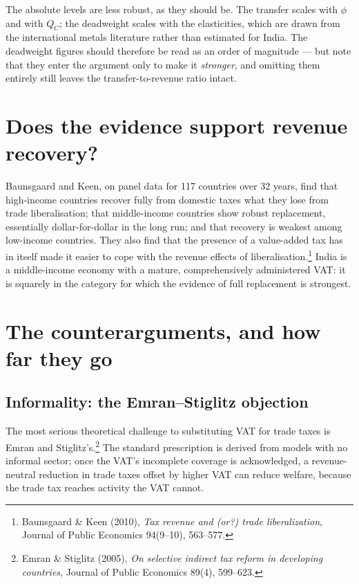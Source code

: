 \documentclass[11pt, a4paper]{article}
\begin{document}
The absolute levels are less robust, as they should be. The transfer scales with
$\phi$ and with $Q_C$; the deadweight scales with the elasticities, which are drawn
from the international metals literature rather than estimated for India. The
deadweight figures should therefore be read as an order of magnitude --- but note that
they enter the argument only to make it \emph{stronger}, and omitting them entirely
still leaves the transfer-to-revenue ratio intact.

\section{Does the evidence support revenue recovery?}

Baunsgaard and Keen, on panel data for 117 countries over 32 years, find that
high-income countries recover fully from domestic taxes what they lose from trade
liberalisation; that middle-income countries show robust replacement, essentially
dollar-for-dollar in the long run; and that recovery is weakest among low-income
countries. They also find that the presence of a value-added tax has in itself made
it easier to cope with the revenue effects of
liberalisation.\footnote{Baunsgaard \& Keen (2010), \textit{Tax revenue and (or?)
trade liberalization}, Journal of Public Economics 94(9--10), 563--577.} India is a
middle-income economy with a mature, comprehensively administered VAT: it is squarely
in the category for which the evidence of full replacement is strongest.

\section{The counterarguments, and how far they go}

\subsection{Informality: the Emran--Stiglitz objection}

The most serious theoretical challenge to substituting VAT for trade taxes is Emran
and Stiglitz's.\footnote{Emran \& Stiglitz (2005), \textit{On selective indirect tax
reform in developing countries}, Journal of Public Economics 89(4), 599--623.} The
standard prescription is derived from models with no informal sector; once the VAT's
incomplete coverage is acknowledged, a revenue-neutral reduction in trade taxes
offset by higher VAT can reduce welfare, because the trade tax reaches activity the
VAT cannot.
\end{document}
